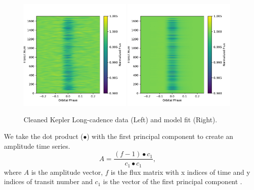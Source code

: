 \documentclass[preprint]{aastex61}
\begin{document}
\begin{figure}[!hbtp]
\begin{centering}
\includegraphics[width=0.49\textwidth]{images/kepler/photometry_riverplot.pdf}
\includegraphics[width=0.49\textwidth]{images/kepler/model_riverplot.pdf}
\caption{Cleaned Kepler Long-cadence data (Left) and model fit (Right).}\label{fig:kepPCA}
\end{centering}
\end{figure}

We take the dot product ($\bullet$) with the first principal component to create an amplitude time series.
\begin{equation}
A = \frac{(f - 1) \bullet c_1}{c_1 \bullet c_1},
\end{equation}
where $A$ is the amplitude vector, $f$ is the flux matrix with x indices of time and y indices of transit number and $c_1$ is the vector of the first principal component .
\end{document}
